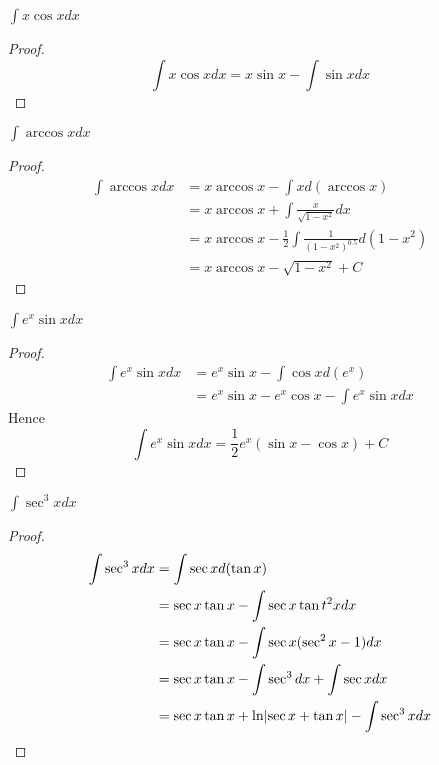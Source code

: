 \documentclass[11pt]{article}
\begin{document}
\begin{proposition}[]
\(\int x\cos xdx\)
\end{proposition}

\begin{proof}
\begin{equation*}
\int x\cos xdx=x\sin x-\int\sin xdx
\end{equation*}
\end{proof}

\begin{proposition}[]
\(\int\arccos xdx\)
\end{proposition}

\begin{proof}
\begin{align*}
\int\arccos xdx&=x\arccos x-\int xd(\arccos x)\\
&=x\arccos x+\int\frac{x}{\sqrt{1-x^2}}dx\\
&=x\arccos x-\frac{1}{2}\int\frac{1}{(1-x^2)^{0.5}}d(1-x^2)\\
&=x\arccos x-\sqrt{1-x^2}+C
\end{align*}
\end{proof}

\begin{proposition}[]
\(\int e^x\sin xdx\)
\end{proposition}

\begin{proof}
\begin{align*}
\int e^x\sin xdx&=e^x\sin x -\int\cos xd(e^x)\\
&=e^x\sin x-e^x\cos x-\int e^x\sin xdx
\end{align*}
Hence
\begin{equation*}
\int e^x\sin xdx=\frac{1}{2}e^x(\sin x-\cos x)+C
\end{equation*}
\end{proof}

\begin{proposition}[]
\(\int\sec^3xdx\)
\end{proposition}

\begin{proof}
\begin{align*}
\int\sec^3xdx&=\int\sec xd(\tan x)\\
&=\sec x\tan x-\int\sec x\tan t^2xdx\\
&=\sec x\tan x-\int\sec x(\sec^2x-1)dx\\
&=\sec x\tan x-\int\sec^3dx+\int\sec xdx\\
&=\sec x\tan x+\ln\abs{\sec x+\tan x}-\int\sec^3xdx
\end{align*}
\end{proof}
\end{document}
